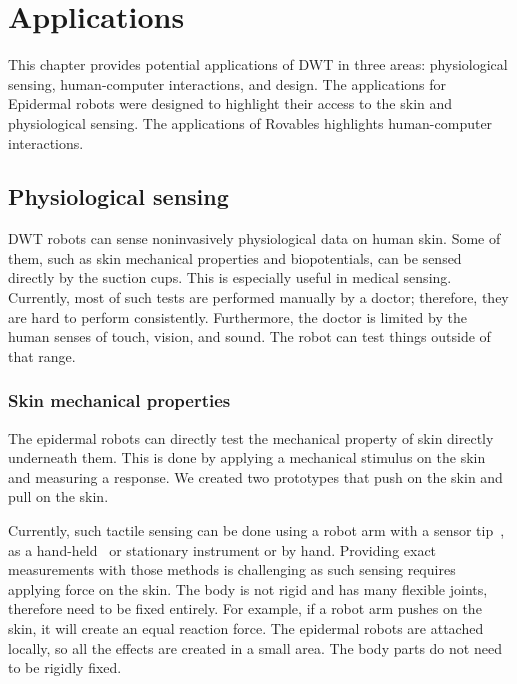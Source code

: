 \chapter{Applications}
This chapter provides potential applications of DWT in three areas: physiological sensing, human-computer interactions, and design. The applications for Epidermal robots were designed to highlight their access to the skin and physiological sensing. The applications of Rovables highlights human-computer interactions. 
\section{Physiological sensing}
DWT robots can sense noninvasively physiological data on human skin. Some of them, such as skin mechanical properties and biopotentials, can be sensed directly by the suction cups. This is especially useful in medical sensing. Currently, most of such tests are performed manually by a doctor; therefore, they are hard to perform consistently. Furthermore, the doctor is limited by the human senses of touch, vision, and sound. The robot can test things outside of that range. 

\subsection{Skin mechanical properties}
The epidermal robots can directly test the mechanical property of skin directly underneath them. This is done by applying a mechanical stimulus on the skin and measuring a response. We created two prototypes that push on the skin and pull on the skin. 

Currently, such tactile sensing can be done using a robot arm with a sensor tip~\cite{kawasaki2002dexterous}, as a hand-held~\cite{wellman2001tactile} or stationary instrument or by hand.  Providing exact measurements with those methods is challenging as such sensing requires applying force on the skin. The body is not rigid and has many flexible joints, therefore need to be fixed entirely. For example, if a robot arm pushes on the skin, it will create an equal reaction force. The epidermal robots are attached locally, so all the effects are created in a small area. The body parts do not need to be rigidly fixed. 



